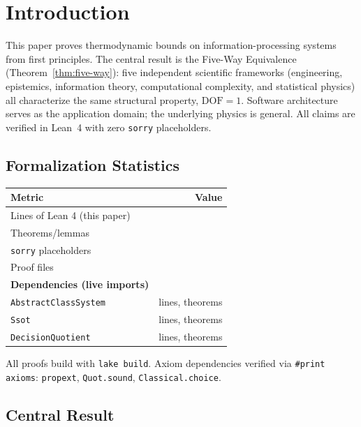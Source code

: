 \section{Introduction}\label{introduction}

This paper proves thermodynamic bounds on information-processing systems from first principles. The central result is the Five-Way Equivalence (Theorem~\ref{thm:five-way}): five independent scientific frameworks (engineering, epistemics, information theory, computational complexity, and statistical physics) all characterize the same structural property, $\mathrm{DOF} = 1$. Software architecture serves as the application domain; the underlying physics is general. All claims are verified in Lean~4 with zero \texttt{sorry} placeholders.

\subsection{Formalization Statistics}

\begin{center}
\begin{tabular}{lr}
\hline
\textbf{Metric} & \textbf{Value} \\
\hline
Lines of Lean 4 (this paper) & \LeanTotalLines{} \\
Theorems/lemmas & \LeanTotalTheorems{} \\
\texttt{sorry} placeholders & \LeanTotalSorry{} \\
Proof files & \LeanTotalFiles{} \\
\hline
\textbf{Dependencies (live imports)} & \\
\texttt{AbstractClassSystem} & \LeanDepLinesAbstractClassSystem{} lines, \LeanDepTheoremsAbstractClassSystem{} theorems \\
\texttt{Ssot} & \LeanDepLinesSsot{} lines, \LeanDepTheoremsSsot{} theorems \\
\texttt{DecisionQuotient} & \LeanDepLinesDecisionQuotient{} lines, \LeanDepTheoremsDecisionQuotient{} theorems \\
\hline
\end{tabular}
\end{center}

All proofs build with \texttt{lake build}. Axiom dependencies verified via \texttt{\#print axioms}: \texttt{propext}, \texttt{Quot.sound}, \texttt{Classical.choice}.

\subsection{Central Result}

